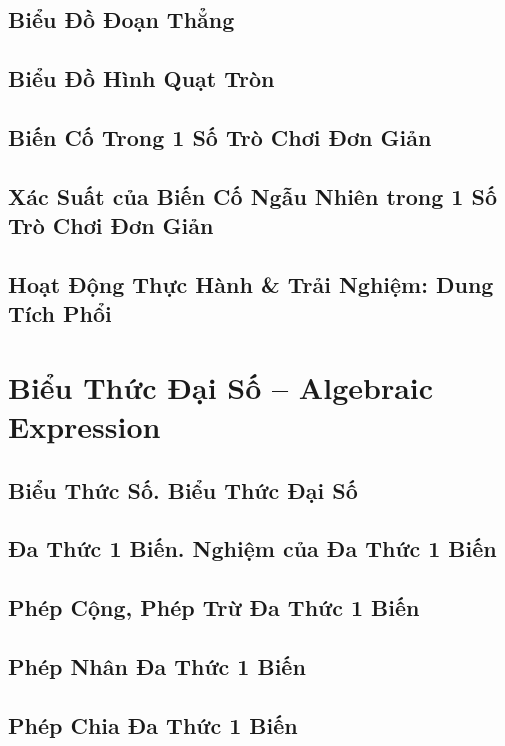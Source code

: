 \documentclass[oneside]{book}
\numberwithin{equation}{section}
\begin{document}
\section{Biểu Đồ Đoạn Thẳng}

\section{Biểu Đồ Hình Quạt Tròn}

\section{Biến Cố Trong 1 Số Trò Chơi Đơn Giản}

\section{Xác Suất của Biến Cố Ngẫu Nhiên trong 1 Số Trò Chơi Đơn Giản}

\section{Hoạt Động Thực Hành \& Trải Nghiệm: Dung Tích Phổi}


\chapter{Biểu Thức Đại Số -- Algebraic Expression}

\section{Biểu Thức Số. Biểu Thức Đại Số}

\section{Đa Thức 1 Biến. Nghiệm của Đa Thức 1 Biến}

\section{Phép Cộng, Phép Trừ Đa Thức 1 Biến}

\section{Phép Nhân Đa Thức 1 Biến}

\section{Phép Chia Đa Thức 1 Biến}
\end{document}
